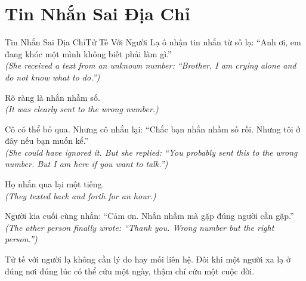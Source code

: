 \section{Tin Nhắn Sai Địa Chỉ}
\begin{truyen}{Tin Nhắn Sai Địa Chỉ}{Tử Tế Với Người Lạ}
ô nhận tin nhắn từ số lạ: ``Anh ơi, em đang khóc một mình không biết phải làm gì.''\\
\textit{(She received a text from an unknown number: ``Brother, I am crying alone and do not know what to do.'')}

Rõ ràng là nhắn nhầm số.\\
\textit{(It was clearly sent to the wrong number.)}

Cô có thể bỏ qua. Nhưng cô nhắn lại: ``Chắc bạn nhắn nhầm số rồi. Nhưng tôi ở đây nếu bạn muốn kể.''\\
\textit{(She could have ignored it. But she replied: ``You probably sent this to the wrong number. But I am here if you want to talk.'')}

Họ nhắn qua lại một tiếng.\\
\textit{(They texted back and forth for an hour.)}

Người kia cuối cùng nhắn: ``Cảm ơn. Nhắn nhầm mà gặp đúng người cần gặp.''\\
\textit{(The other person finally wrote: ``Thank you. Wrong number but the right person.'')}
\end{truyen}
\begin{baihoc}
  Tử tế với người lạ không cần lý do hay mối liên hệ. Đôi khi một người xa lạ ở đúng nơi đúng lúc có thể cứu một ngày, thậm chí cứu một cuộc đời.
\end{baihoc}

